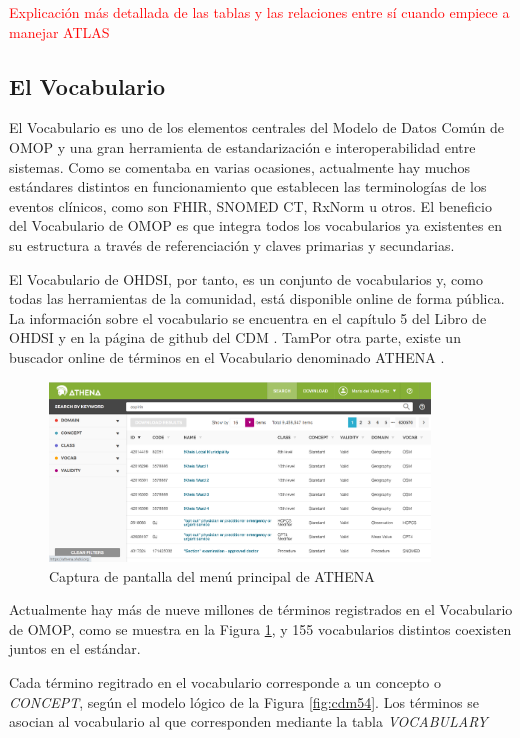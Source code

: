 \textcolor{red}{Explicación más detallada de las tablas y las relaciones entre sí cuando empiece a manejar ATLAS}

\subsection{El Vocabulario}

El Vocabulario es uno de los elementos centrales del Modelo de Datos Común de OMOP y una gran herramienta de estandarización e interoperabilidad entre sistemas. Como se comentaba en varias ocasiones, actualmente hay muchos estándares distintos en funcionamiento que establecen las terminologías de los eventos clínicos, como son FHIR, SNOMED CT, RxNorm u otros. El beneficio del Vocabulario de OMOP es que integra todos los vocabularios ya existentes en su estructura a través de referenciación y claves primarias y secundarias.

El Vocabulario de OHDSI, por tanto, es un conjunto de vocabularios y, como todas las herramientas de la comunidad, está disponible online de forma pública. La información sobre el vocabulario se encuentra en el capítulo 5 del Libro de OHDSI \cite{OHDSIbook} y en la página de github del CDM \cite{gitPagesCMD}. TamPor otra parte, existe un buscador online de términos en el Vocabulario denominado ATHENA \cite{ATHENAweb}. 

\begin{figure}[H]
\centering
\includegraphics[width=0.90\textwidth]{figures/ATHENAcap.png}
     \caption{Captura de pantalla del menú principal de ATHENA}
    \label{fig:ATHENAcap}
\end{figure}

Actualmente hay más de nueve millones de términos registrados en el Vocabulario de OMOP, como se muestra en la Figura \ref{fig:ATHENAcap}, y 155 vocabularios distintos coexisten juntos en el estándar.

Cada término regitrado en el vocabulario corresponde a un concepto o \textit{CONCEPT}, según el modelo lógico de la Figura \ref{fig:cdm54}. Los términos se asocian al vocabulario al que corresponden mediante la tabla \textit{VOCABULARY}


